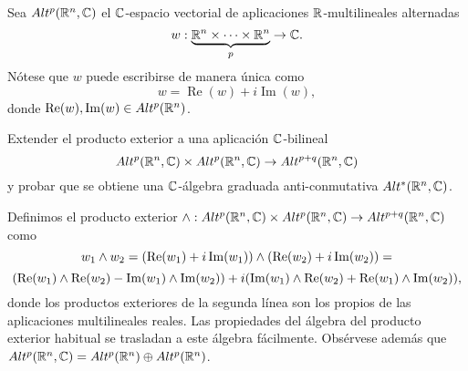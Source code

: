 \documentclass[twoside]{article}
\begin{document}
\begin{ejercicio}{3.4}
Sea $Alt^p(\mathbb{R}^n,\mathbb{C})$ el $\mathbb{C}$-espacio vectorial de aplicaciones $\mathbb{R}$-multilineales alternadas 
\[
w:\underbrace{\mathbb{R}^n\times\dots\times\mathbb{R}^n}_{p}\to\mathbb{C}.
\]
Nótese que $w$ puede escribirse de manera única como
\[
w=\operatorname{Re}(w)+i\operatorname{Im}(w),
\]
donde $\operatorname{Re}(w),\operatorname{Im}(w)\in Alt^p(\mathbb{R}^n)$.

Extender el producto exterior a una aplicación $\mathbb{C}$-bilineal 
\[
Alt^p(\mathbb{R}^n,\mathbb{C})\times Alt^p(\mathbb{R}^n,\mathbb{C})\to Alt^{p+q}(\mathbb{R}^n,\mathbb{C})
\]
y probar que se obtiene una $\mathbb{C}$-álgebra graduada anti-conmutativa $Alt^*(\mathbb{R}^n,\mathbb{C})$.
\end{ejercicio}
\begin{solucion}
Definimos el producto exterior $\land: Alt^p(\mathbb{R}^n,\mathbb{C})\times Alt^p(\mathbb{R}^n,\mathbb{C})\to Alt^{p+q}(\mathbb{R}^n,\mathbb{C})$ como 
\[
w_1\land w_2=(\operatorname{Re}(w_1)+i\operatorname{Im}(w_1))\land(\operatorname{Re}(w_2)+i\operatorname{Im}(w_2))=
\]
\[
(\operatorname{Re}(w_1)\land\operatorname{Re}(w_2)-\operatorname{Im}(w_1)\land\operatorname{Im}(w_2))+i(\operatorname{Im}(w_1)\land\operatorname{Re}(w_2)+\operatorname{Re}(w_1)\land\operatorname{Im}(w_2)),
\]
donde los productos exteriores de la segunda línea son los propios de las aplicaciones multilineales reales. Las propiedades del álgebra del producto exterior habitual se trasladan a este álgebra fácilmente. Obsérvese además que $ Alt^p(\mathbb{R}^n,\mathbb{C})=Alt^p(\mathbb{R}^n)\oplus  Alt^p(\mathbb{R}^n)$.
\end{solucion}

\newpage
\end{document}
